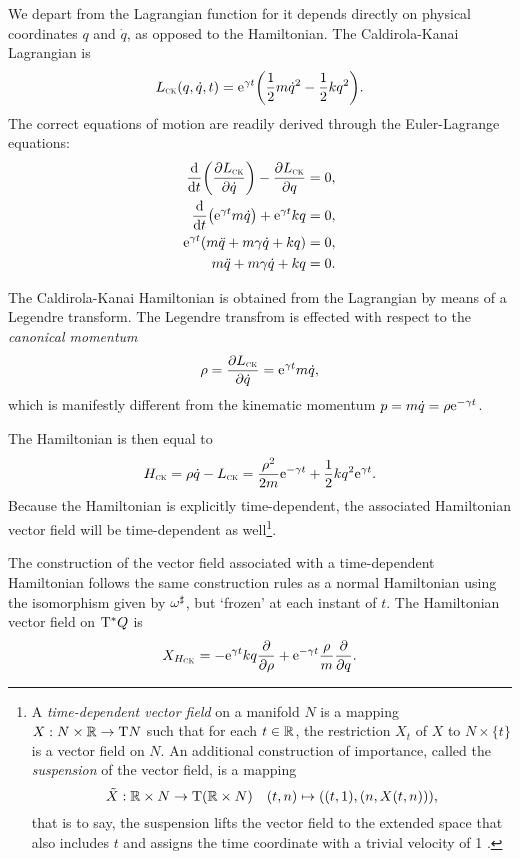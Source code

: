 We depart from the Lagrangian function for it depends directly on physical coordinates $q$ and $\dot{q}$, as opposed to the Hamiltonian. The Caldirola-Kanai Lagrangian is
\begin{equation}
    L_\text{\tiny{\textsc{CK}}}(q, \dot{q}, t) = \mathrm{e}^{\gamma t}\qty(\frac{1}{2}m\dot{q}^2 - \frac{1}{2}kq^2).
    \label{eq:lag_CK}
\end{equation}
The correct equations of motion are readily derived through the Euler-Lagrange equations:
\begin{equation}
    \begin{split}
        \dv{}{t}\qty(\pdv{\ensuremath{L_\text{\tiny{\textsc{CK}}}}}{\dot{q}}) - \pdv{\ensuremath{L_\text{\tiny{\textsc{CK}}}}}{q} &= 0, \\
        \dv{}{t}\qty(\mathrm{e}^{\gamma t } m \dot{q}) + \mathrm{e}^{\gamma t} kq &= 0, \\
        \mathrm{e}^{\gamma t } \qty(m\ddot{q} + m\gamma\dot{q} + kq)  &= 0, \\
        m\ddot{q} + m\gamma\dot{q} + kq &= 0. \\
    \end{split}
\end{equation}

The Caldirola-Kanai Hamiltonian is obtained from the Lagrangian by means of a Legendre transform. The Legendre transfrom is effected with respect to the \emph{canonical momentum}
$$ \rho = \pdv{\ensuremath{L_\text{\tiny{\textsc{CK}}}}}{\dot{q}} = \mathrm{e}^{\gamma t} m \dot{q}, $$
which is manifestly different from the kinematic momentum $p = m\dot{q} = \rho \mathrm{e}^{-\gamma t}$.

The Hamiltonian is then equal to
$$ H_\text{\tiny{\textsc{CK}}} = \rho\dot{q} - L_\text{\tiny{\textsc{CK}}} =  \frac{\rho^2}{2m}\mathrm{e}^{-\gamma t} + \frac{1}{2}kq^2\mathrm{e}^{\gamma t}. $$
Because the Hamiltonian is explicitly time-dependent, the associated Hamiltonian vector field will be time-dependent as well\footnote
{A \emph{time-dependent vector field} on a manifold $N$ is a mapping $X: N\times\mathbb{R} \to \mathrm{T}N$ such that for each $t \in \mathbb{R}$, the restriction $X_t$ of $X$ to $N \times \{t\}$ is a vector field on $N$. \cite{Libermann1987} An additional construction of importance, called the \emph{suspension} of the vector field, is a mapping $$ \tilde{X}: \mathbb{R} \times N \to \mathrm{T}(\mathbb{R} \times N) \quad (t, n) \mapsto ((t, 1), (n, X(t, n))),$$ that is to say, the suspension lifts the vector field to the extended space that also includes $t$ and assigns the time coordinate with a trivial velocity of 1 \cite{Abraham1978}.}.

The construction of the vector field associated with a time-dependent Hamiltonian follows the same construction rules as a normal Hamiltonian using the isomorphism given by $\omega^\sharp$, but `frozen' at each instant of $t$. The Hamiltonian vector field on $\mathrm{T}^*Q$ is
$$ X_{H_\text{\tiny{\textsc{CK}}}} = -\mathrm{e}^{\gamma t}kq\pdv{}{\ensuremath{\rho}} + \mathrm{e}^{-\gamma t}\frac{\rho}{m}\pdv{}{q}.$$


